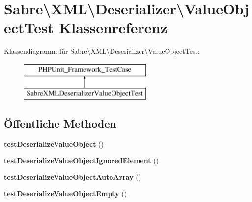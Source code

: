 \hypertarget{class_sabre_1_1_x_m_l_1_1_deserializer_1_1_value_object_test}{}\section{Sabre\textbackslash{}X\+ML\textbackslash{}Deserializer\textbackslash{}Value\+Object\+Test Klassenreferenz}
\label{class_sabre_1_1_x_m_l_1_1_deserializer_1_1_value_object_test}
Klassendiagramm für Sabre\textbackslash{}X\+ML\textbackslash{}Deserializer\textbackslash{}Value\+Object\+Test\+:\begin{figure}[H]
\begin{center}
\leavevmode
\includegraphics[height=2.000000cm]{class_sabre_1_1_x_m_l_1_1_deserializer_1_1_value_object_test}
\end{center}
\end{figure}
\subsection*{Öffentliche Methoden}
\begin{DoxyCompactItemize}
\item 
\mbox{\label{class_sabre_1_1_x_m_l_1_1_deserializer_1_1_value_object_test_a149b12ce06b6fe881514b440a9b01832}} 
{\bfseries test\+Deserialize\+Value\+Object} ()
\item 
\mbox{\label{class_sabre_1_1_x_m_l_1_1_deserializer_1_1_value_object_test_acbb577b521bdf7741cdaf28346f6a9af}} 
{\bfseries test\+Deserialize\+Value\+Object\+Ignored\+Element} ()
\item 
\mbox{\label{class_sabre_1_1_x_m_l_1_1_deserializer_1_1_value_object_test_acb46682e2ce3921fb9d488513bff95a6}} 
{\bfseries test\+Deserialize\+Value\+Object\+Auto\+Array} ()
\item 
\mbox{\label{class_sabre_1_1_x_m_l_1_1_deserializer_1_1_value_object_test_ad94c49f781727ebaa3571c3fb46d51e1}} 
{\bfseries test\+Deserialize\+Value\+Object\+Empty} ()
\end{DoxyCompactItemize}


